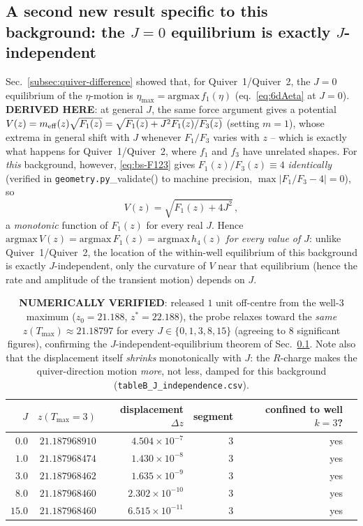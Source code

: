 \documentclass[11pt]{article}
\begin{document}
\subsection{A second new result specific to this background: the $J=0$ equilibrium is exactly $J$-independent}
\label{subsec:bs-Jindependence}

Sec.~\ref{subsec:quiver-difference} showed that, for Quiver~1/Quiver~2, the $J{=}0$ equilibrium of the $\eta$-motion is $\eta_{\max}=\mathrm{argmax}\,f_1(\eta)$ (eq.~\eqref{eq:6dAeta} at $J=0$). \textbf{DERIVED HERE}: at general $J$, the same force argument gives a potential $V(z)=m_{\rm eff}(z)\sqrt{F_1(z)}=\sqrt{F_1(z)+J^2F_1(z)/F_3(z)}$ (setting $m=1$), whose extrema in general shift with $J$ whenever $F_1/F_3$ varies with $z$ -- which is exactly what happens for Quiver~1/Quiver~2, where $f_1$ and $f_3$ have unrelated shapes. For \emph{this} background, however, \eqref{eq:bs-F123} gives $F_1(z)/F_3(z)\equiv4$ \emph{identically} (verified in \texttt{geometry.py}\_validate() to machine precision, $\max|F_1/F_3-4|=0$), so
\begin{equation}
V(z) = \sqrt{F_1(z)+4J^2}\,,
\end{equation}
a \emph{monotonic} function of $F_1(z)$ for every real $J$. Hence $\mathrm{argmax}\,V(z)=\mathrm{argmax}\,F_1(z)=\mathrm{argmax}\,h_4(z)$ \emph{for every value of $J$}: unlike Quiver~1/Quiver~2, the location of the within-well equilibrium of this background is exactly $J$-independent, only the curvature of $V$ near that equilibrium (hence the rate and amplitude of the transient motion) depends on $J$.

\begin{table}[H]
\centering
\begin{tabular}{@{}rrrrrr@{}}
\toprule
$J$ & $z(T_{\max}{=}3)$ & displacement $\Delta z$ & segment & confined to well $k{=}3$?\\
\midrule
$0.0$ & $21.187968910$ & $4.504\times10^{-7}$ & 3 & yes\\
$1.0$ & $21.187968474$ & $1.430\times10^{-8}$ & 3 & yes\\
$3.0$ & $21.187968462$ & $1.635\times10^{-9}$ & 3 & yes\\
$8.0$ & $21.187968460$ & $2.302\times10^{-10}$ & 3 & yes\\
$15.0$ & $21.187968460$ & $6.515\times10^{-11}$ & 3 & yes\\
\bottomrule
\end{tabular}
\caption{\textbf{NUMERICALLY VERIFIED}: released $1$ unit off-centre from the well-3 maximum ($z_0=21.188$, $z^*=22.188$), the probe relaxes toward the \emph{same} $z(T_{\max})\approx21.18797$ for every $J\in\{0,1,3,8,15\}$ (agreeing to $8$ significant figures), confirming the $J$-independent-equilibrium theorem of Sec.~\ref{subsec:bs-Jindependence}. Note also that the displacement itself \emph{shrinks} monotonically with $J$: the $R$-charge makes the quiver-direction motion \emph{more}, not less, damped for this background (\texttt{tableB\_J\_independence.csv}).}
\label{tab:bs-Jindependence}
\end{table}
\end{document}
